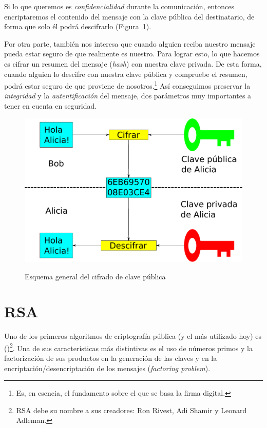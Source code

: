  Si lo que queremos es \emph{confidencialidad} durante la comunicación, entonces encriptaremos el contenido del mensaje con la clave pública del destinatario, de forma que solo él podrá descifrarlo (Figura~\ref{fig:PublicKeyEncryption}).

 Por otra parte, también nos interesa que cuando alguien reciba nuestro mensaje pueda estar seguro de que realmente es nuestro.
 Para lograr esto, lo que hacemos es cifrar un resumen del mensaje (\emph{hash}) con nuestra clave privada.
 De esta forma, cuando alguien lo descifre con nuestra clave pública y compruebe el resumen, podrá estar seguro de que proviene de nosotros.\footnote{Es, en esencia, el fundamento sobre el que se basa la firma digital.}
 Así conseguimos preservar la \emph{integridad} y la \emph{autentificación} del mensaje, dos parámetros muy importantes a tener en cuenta en seguridad. \emph{\parencite{Reference14}}

 \begin{figure}[ht]
   \centering
   \includegraphics[scale=0.5]{Figures/PublicKeyEncryption}
   \decoRule
   \caption[Cifrado de clave pública (Esquema)]{Esquema general del cifrado de clave pública} \emph{\parencite{Reference5}}
   \label{fig:PublicKeyEncryption}
 \end{figure}


 \section{RSA}

 Uno de los primeros algoritmos de criptografía pública (y el más utilizado hoy) es  ()\footnote{RSA debe su nombre a sus creadores: Ron Rivest, Adi Shamir y Leonard Adleman.}.
 Una de sus características más distintivas es el uso de números primos y la factorización de sus productos en la generación de las claves y en la encriptación/desencriptación de los mensajes (\emph{factoring problem}).

